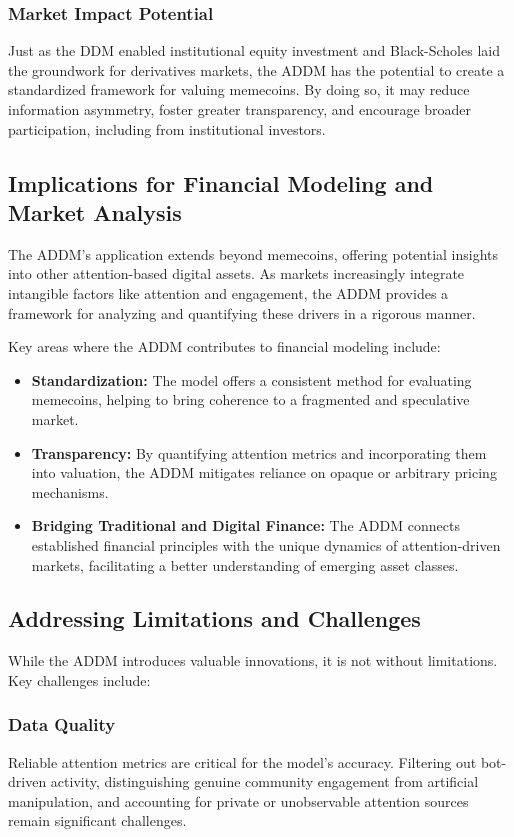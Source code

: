 \documentclass[a4paper,12pt]{article}
\begin{document}
\subsubsection*{Market Impact Potential}
Just as the DDM enabled institutional equity investment and Black-Scholes laid the groundwork for derivatives markets, the ADDM has the potential to create a standardized framework for valuing memecoins. By doing so, it may reduce information asymmetry, foster greater transparency, and encourage broader participation, including from institutional investors.

\subsection*{Implications for Financial Modeling and Market Analysis}

The ADDM’s application extends beyond memecoins, offering potential insights into other attention-based digital assets. As markets increasingly integrate intangible factors like attention and engagement, the ADDM provides a framework for analyzing and quantifying these drivers in a rigorous manner.

Key areas where the ADDM contributes to financial modeling include:
\begin{itemize}
    \item \textbf{Standardization:} The model offers a consistent method for evaluating memecoins, helping to bring coherence to a fragmented and speculative market.
    \item \textbf{Transparency:} By quantifying attention metrics and incorporating them into valuation, the ADDM mitigates reliance on opaque or arbitrary pricing mechanisms.
    \item \textbf{Bridging Traditional and Digital Finance:} The ADDM connects established financial principles with the unique dynamics of attention-driven markets, facilitating a better understanding of emerging asset classes.
\end{itemize}

\subsection*{Addressing Limitations and Challenges}

While the ADDM introduces valuable innovations, it is not without limitations. Key challenges include:

\subsubsection*{Data Quality}
Reliable attention metrics are critical for the model’s accuracy. Filtering out bot-driven activity, distinguishing genuine community engagement from artificial manipulation, and accounting for private or unobservable attention sources remain significant challenges.
\end{document}
